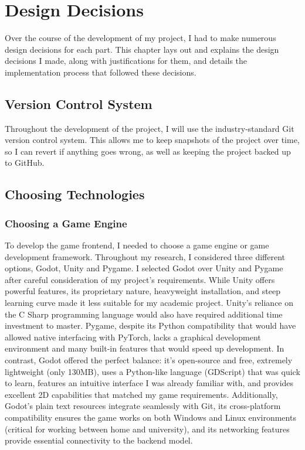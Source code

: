 \chapter{Design Decisions}

Over the course of the development of my project, I had to make numerous design decisions for each part. 
This chapter lays out and explains the design decisions I made, along with justifications for them, and details the implementation process that followed these decisions.

\section{Version Control System}

Throughout the development of the project, I will use the industry-standard Git version control system. 
This allows me to keep snapshots of the project over time, so I can revert if anything goes wrong, as well as keeping the project backed up to GitHub.

\section{Choosing Technologies}

\subsection{Choosing a Game Engine}

To develop the game frontend, I needed to choose a game engine or game development framework. Throughout my research, I considered three different options, Godot, Unity and Pygame.
I selected Godot over Unity and Pygame after careful consideration of my project's requirements. 
While Unity offers powerful features, its proprietary nature, heavyweight installation, and steep learning curve made it less suitable for my academic project. 
Unity's reliance on the C Sharp programming language would also have required additional time investment to master. 
Pygame, despite its Python compatibility that would have allowed native interfacing with PyTorch, lacks a graphical development environment and many built-in features that would speed up development. 
In contrast, Godot offered the perfect balance: it's open-source and free, extremely lightweight (only 130MB), uses a Python-like language (GDScript) that was quick to learn, features an intuitive interface I was already familiar with, and provides excellent 2D capabilities that matched my game requirements.
Additionally, Godot's plain text resources integrate seamlessly with Git, its cross-platform compatibility ensures the game works on both Windows and Linux environments (critical for working between home and university), and its networking features provide essential connectivity to the backend model.


